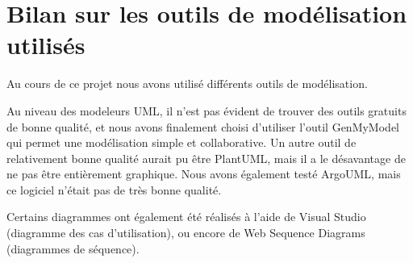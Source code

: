 \documentclass[a4paper, 11pt, titlepage]{article}
\begin{document}





\section {Bilan sur les outils de modélisation utilisés}

Au cours de ce projet nous avons utilisé différents outils de modélisation.

Au niveau des modeleurs UML, il n'est pas évident de trouver des outils gratuits de bonne qualité, et nous avons finalement choisi d'utiliser l'outil GenMyModel qui permet une modélisation simple et collaborative. Un autre outil de relativement bonne qualité aurait pu être PlantUML, mais il a le désavantage de ne pas être entièrement graphique. Nous avons également testé ArgoUML, mais ce logiciel n'était pas de très bonne qualité.

Certains diagrammes ont également été réalisés à l'aide de Visual Studio (diagramme des cas d'utilisation), ou encore de Web Sequence Diagrams (diagrammes de séquence).
\end{document}
